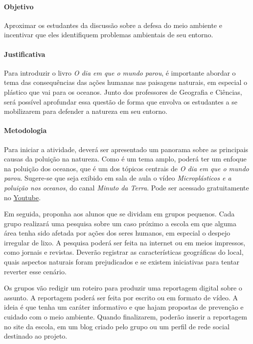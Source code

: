 \documentclass[11pt]{extarticle}
\begin{document}
\paragraph{Objetivo} Aproximar os estudantes da discussão sobre a defesa do meio ambiente e incentivar que eles identifiquem problemas ambientais de seu entorno. 


\paragraph{Justificativa} Para introduzir o livro \textit{O dia em que o mundo parou}, é importante abordar o tema das consequências das ações humanas nas paisagens naturais, em especial o plástico que vai para os oceanos. Junto dos professores de Geografia e Ciências, será possível aprofundar essa questão de forma que envolva os estudantes a se mobilizarem para defender a natureza em seu entorno.

\paragraph{Metodologia} Para iniciar a atividade, deverá ser apresentado um panorama sobre as principais causas da poluição na natureza. Como é um tema amplo, poderá ter um enfoque na poluição dos oceanos, que é um dos tópicos centrais de \textit{O dia em que o mundo parou}. Sugere-se que seja exibido em sala de aula o vídeo \textit{Microplásticos e a poluição nos oceanos}, do canal \textit{Minuto da Terra}. Pode ser acessado gratuitamente no \href{https://youtu.be/adc0cOqE4qs}{Youtube}. 

Em seguida, proponha aos alunos que se dividam em grupos pequenos. Cada grupo realizará uma pesquisa sobre um caso próximo a escola em que alguma área tenha sido afetada por ações dos seres humanos, em especial o despejo irregular de lixo. A pesquisa poderá ser feita na internet ou em meios impressos, como jornais e revistas. Deverão registrar as características geográficas do local, quais aspectos naturais foram prejudicados e se existem iniciativas para tentar reverter esse cenário.


Os grupos vão redigir um roteiro para produzir uma reportagem digital sobre o assunto. A reportagem poderá ser feita por escrito ou em formato de vídeo. A ideia é que tenha um caráter informativo e que hajam propostas de prevenção e cuidado com o meio ambiente. Quando finalizarem, poderão inserir a reportagem no site da escola, em um blog criado pelo grupo ou um perfil de rede social destinado ao projeto.
\end{document}
